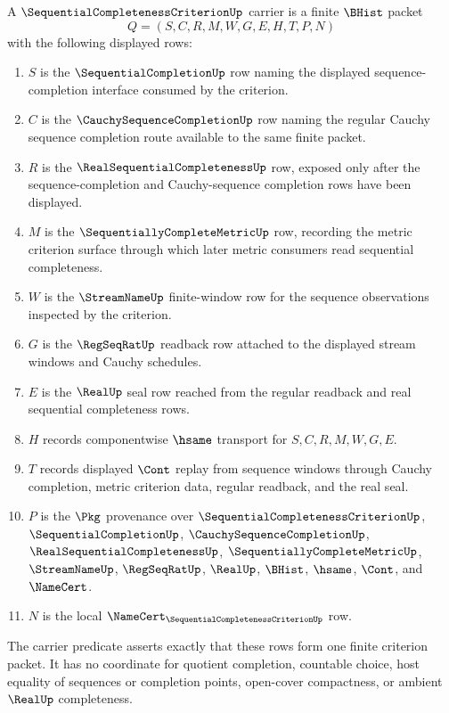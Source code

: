 \begin{definition}
\label{def:sequential-completeness-criterion-carrier}
A $\SequentialCompletenessCriterionUp$ carrier is a finite $\BHist$ packet
$$
Q=(S,C,R,M,W,G,E,H,T,P,N)
$$
with the following displayed rows:
\begin{enumerate}
\item $S$ is the $\SequentialCompletionUp$ row naming the displayed sequence-completion interface consumed by the criterion.
\item $C$ is the $\CauchySequenceCompletionUp$ row naming the regular Cauchy sequence completion route available to the same finite packet.
\item $R$ is the $\RealSequentialCompletenessUp$ row, exposed only after the sequence-completion and Cauchy-sequence completion rows have been displayed.
\item $M$ is the $\SequentiallyCompleteMetricUp$ row, recording the metric criterion surface through which later metric consumers read sequential completeness.
\item $W$ is the $\StreamNameUp$ finite-window row for the sequence observations inspected by the criterion.
\item $G$ is the $\RegSeqRatUp$ readback row attached to the displayed stream windows and Cauchy schedules.
\item $E$ is the $\RealUp$ seal row reached from the regular readback and real sequential completeness rows.
\item $H$ records componentwise $\hsame$ transport for $S,C,R,M,W,G,E$.
\item $T$ records displayed $\Cont$ replay from sequence windows through Cauchy completion, metric criterion data, regular readback, and the real seal.
\item $P$ is the $\Pkg$ provenance over $\SequentialCompletenessCriterionUp$, $\SequentialCompletionUp$, $\CauchySequenceCompletionUp$, $\RealSequentialCompletenessUp$, $\SequentiallyCompleteMetricUp$, $\StreamNameUp$, $\RegSeqRatUp$, $\RealUp$, $\BHist$, $\hsame$, $\Cont$, and $\NameCert$.
\item $N$ is the local $\NameCert_{\SequentialCompletenessCriterionUp}$ row.
\end{enumerate}
The carrier predicate asserts exactly that these rows form one finite criterion packet. It has no coordinate for quotient completion, countable choice, host equality of sequences or completion points, open-cover compactness, or ambient $\RealUp$ completeness.
\end{definition}

